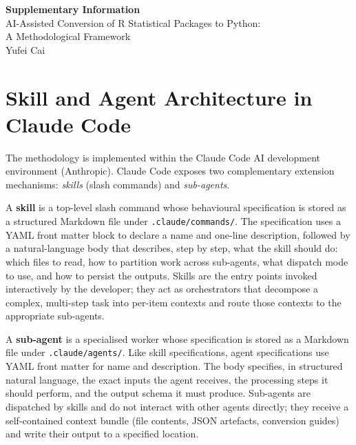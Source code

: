 \documentclass[12pt,a4paper]{article}
\begin{document}
\begin{center}
{\Large\bfseries Supplementary Information}\\[0.6em]
{\large AI-Assisted Conversion of R Statistical Packages to Python:\\A Methodological Framework}\\[0.4em]
{\normalsize Yufei Cai}
\end{center}

\tableofcontents

\clearpage

\section{Skill and Agent Architecture in Claude Code}
\label{supp:architecture}

The methodology is implemented within the Claude Code AI development environment (Anthropic). Claude Code exposes two complementary extension mechanisms: \textit{skills} (slash commands) and \textit{sub-agents}.

A \textbf{skill} is a top-level slash command whose behavioural specification is stored as a structured Markdown file under \texttt{.claude/commands/}. The specification uses a YAML front matter block to declare a name and one-line description, followed by a natural-language body that describes, step by step, what the skill should do: which files to read, how to partition work across sub-agents, what dispatch mode to use, and how to persist the outputs. Skills are the entry points invoked interactively by the developer; they act as orchestrators that decompose a complex, multi-step task into per-item contexts and route those contexts to the appropriate sub-agents.

A \textbf{sub-agent} is a specialised worker whose specification is stored as a Markdown file under \texttt{.claude/agents/}. Like skill specifications, agent specifications use YAML front matter for name and description. The body specifies, in structured natural language, the exact inputs the agent receives, the processing steps it should perform, and the output schema it must produce. Sub-agents are dispatched by skills and do not interact with other agents directly; they receive a self-contained context bundle (file contents, JSON artefacts, conversion guides) and write their output to a specified location.
\end{document}
